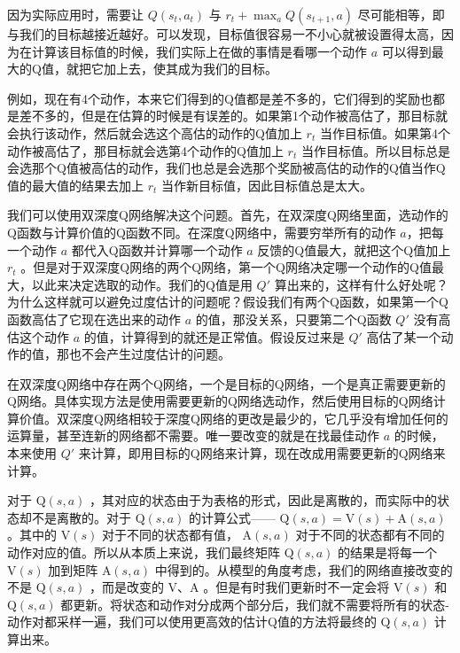 
因为实际应用时，需要让 $Q(s_t ,a_t)$ 与 $r_t+\max_{a}Q(s_{t+1},a)$ 尽可能相等，即与我们的目标越接近越好。可以发现，目标值很容易一不小心就被设置得太高，因为在计算该目标值的时候，我们实际上在做的事情是看哪一个动作 $a$ 可以得到最大的Q值，就把它加上去，使其成为我们的目标。
  
例如，现在有4个动作，本来它们得到的Q值都是差不多的，它们得到的奖励也都是差不多的，但是在估算的时候是有误差的。如果第1个动作被高估了，那目标就会执行该动作，然后就会选这个高估的动作的Q值加上 $r_t$ 当作目标值。如果第4个动作被高估了，那目标就会选第4个动作的Q值加上 $r_t$ 当作目标值。所以目标总是会选那个Q值被高估的动作，我们也总是会选那个奖励被高估的动作的Q值当作Q值的最大值的结果去加上 $r_t$ 当作新目标值，因此目标值总是太大。


我们可以使用双深度Q网络解决这个问题。首先，在双深度Q网络里面，选动作的Q函数与计算价值的Q函数不同。在深度Q网络中，需要穷举所有的动作 $a$，把每一个动作 $a$ 都代入Q函数并计算哪一个动作 $a$ 反馈的Q值最大，就把这个Q值加上 $r_t$ 。但是对于双深度Q网络的两个Q网络，第一个Q网络决定哪一个动作的Q值最大，以此来决定选取的动作。我们的Q值是用 $Q'$ 算出来的，这样有什么好处呢？为什么这样就可以避免过度估计的问题呢？假设我们有两个Q函数，如果第一个Q函数高估了它现在选出来的动作 $a$ 的值，那没关系，只要第二个Q函数 $Q'$ 没有高估这个动作 $a$ 的值，计算得到的就还是正常值。假设反过来是 $Q'$ 高估了某一个动作的值，那也不会产生过度估计的问题。


在双深度Q网络中存在两个Q网络，一个是目标的Q网络，一个是真正需要更新的Q网络。具体实现方法是使用需要更新的Q网络选动作，然后使用目标的Q网络计算价值。双深度Q网络相较于深度Q网络的更改是最少的，它几乎没有增加任何的运算量，甚至连新的网络都不需要。唯一要改变的就是在找最佳动作 $a$ 的时候，本来使用 $Q'$ 来计算，即用目标的Q网络来计算，现在改成用需要更新的Q网络来计算。


对于 $\mathrm{Q}(s,a)$ ，其对应的状态由于为表格的形式，因此是离散的，而实际中的状态却不是离散的。对于 $\mathrm{Q}(s,a)$ 的计算公式—— $\mathrm{Q}(s,a)=\mathrm{V}(s)+\mathrm{A}(s,a)$ 。其中的 $\mathrm{V}(s)$ 对于不同的状态都有值， $\mathrm{A}(s,a)$ 对于不同的状态都有不同的动作对应的值。所以从本质上来说，我们最终矩阵 $\mathrm{Q}(s,a)$ 的结果是将每一个 $\mathrm{V}(s)$ 加到矩阵 $\mathrm{A}(s,a)$ 中得到的。从模型的角度考虑，我们的网络直接改变的不是 $\mathrm{Q}(s,a)$ ，而是改变的 $\mathrm{V}$、$\mathrm{A}$ 。但是有时我们更新时不一定会将 $\mathrm{V}(s)$ 和 $\mathrm{Q}(s,a)$ 都更新。将状态和动作对分成两个部分后，我们就不需要将所有的状态-动作对都采样一遍，我们可以使用更高效的估计Q值的方法将最终的 $\mathrm{Q}(s,a)$ 计算出来。

